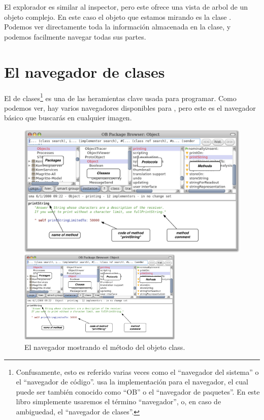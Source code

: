 \documentclass[a4paper,10pt,twoside]{book}
\begin{document}
El explorador es similar al inspector, pero este ofrece una vista de arbol de un objeto complejo.
En este caso el objeto que estamos mirando es la clase .
Podemos ver directamente toda la informaci\'on almacenada en la clase, y podemos facilmente navegar todas sus partes.

\section{El navegador de clases}

El  de clases\footnote{Confusamente, esto es referido varias veces como el ``navegador del sistema'' o el ``navegador de c\'odigo''. \pharo usa la implementaci\'on  para el navegador, el cual puede ser tambi\'en conocido como ``OB'' o el ``navegador de paquetes''.
En este libro simplemente usaremos el t\'ermino ``navegador'', o, en caso de ambiguedad, el ``navegador de clases''.} es una de las heramientas clave usada para programar.
Como podemos ver, hay varios navegadores disponibles para \pharo, pero este es el navegador b\'asico que buscar\'as en cualquier imagen.


\begin{figure}[htb]
\ifluluelse
	{\centerline {\includegraphics[width=\textwidth]{ClassBrowser1}}}
	{\centerline {\includegraphics[width=0.7\textwidth]{ClassBrowser1}}}
\caption{El navegador mostrando el m\'etodo  del objeto class.
}
\end{figure}
\end{document}
